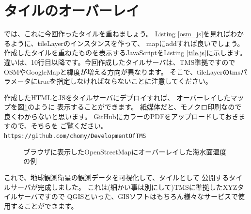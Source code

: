 \section*{タイルのオーバーレイ}
      
では、これに今回作ったタイルを重ねましょう。
Listing \ref{osm_js}を見ればわかるように、tileLayerのインスタンスを作って、
mapにaddすれば良いでしょう。作成したタイルを重ねたものを表示するJavaScriptをListing \ref{tile.js}に示します。
違いは、10行目以降です。今回作成したタイルサーバは、TMS準拠ですので
OSMやGoogleMapと緯度が増える方向が異なります。
そこで、tileLayerのtmsパラメータにtrueを指定しなければならないことに注意してください。



作成したHTMLとJSをタイルサーバにデプロイすれば、
オーバーレイしたマップを図\ref{fig:browser}のように
表示することができます。
紙媒体だと、モノクロ印刷なので良くわからないと思います。
GitHubにカラーのPDFをアップロードしておきますので、そちらを
ご覧ください。
\texttt{https://github.com/chomy/DevelopmentOfTMS}

\begin{figure}[t]
\centering
{}
\caption{ブラウザに表示したOpenStreetMapにオーバーレイした海水面温度の例}
\label{fig:browser}
\end{figure}


これで、地球観測衛星の観測データを可視化して、タイルとして
公開するタイルサーバが完成しました。
これは(細かい事は別にして)TMSに準拠したXYZタイルサーバですので
QGISといった、GISソフトはもちろん様々なサービスで使用することができます。
